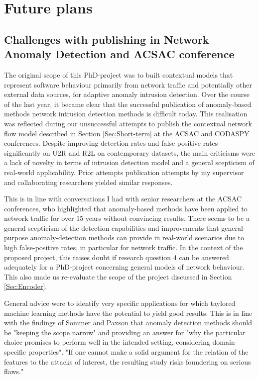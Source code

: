 \documentclass[a4paper,12pt,twoside]{article}
\begin{document}
\section{Future plans}

\subsection{Challenges with publishing in Network Anomaly Detection and ACSAC conference}\label{Sec:Problems}

The original scope of this PhD-project was to built contextual models that represent software behaviour primarily from network traffic and potentially other external data sources, for adaptive anomaly intrusion detection.  
Over the course of the last year, it became clear that the successful publication of anomaly-based methods network intrusion detection methods is difficult today. This realisation was reflected during our unsuccessful attempts to publish the contextual network flow model described in Section \ref{Sec:Short-term} at the ACSAC and CODASPY conferences. Despite improving detection rates and false positive rates significantly on U2R and R2L on contemporary datasets, the main criticisms were a lack of novelty in terms of intrusion detection model and a general scepticism of real-world applicability. Prior attempts publication attempts by my supervisor and collaborating researchers yielded similar responses.

This is in line with conversations I had with senior researchers at the ACSAC conferences, who highlighted that anomaly-based methods have been applied to network traffic for over 15 years without convincing results. There seems to be a general scepticism of the detection capabilities and improvements that general-purpose anomaly-detection methods can provide in real-world scenarios due to high false-positive rates, in particular for network traffic. In the context of the proposed project, this raises doubt if research question 4 can be answered adequately for a PhD-project concerning general models of network behaviour. This also made us re-evaluate the scope of the project discussed in Section \ref{Sec:Encoder}.

General advice were to identify very specific applications for which taylored machine learning methods have the potential to yield good results. This is in line with the findings of Sommer and Paxson \cite{sommer_outside_2010} that anomaly detection methods should be "keeping the scope narrow" and providing an answer for "why the particular choice promises to perform well in the intended setting, considering domain-specific properties". "If one cannot make a solid argument for the relation of the features to the attacks of interest, the resulting study risks foundering on serious flaws."
\end{document}
